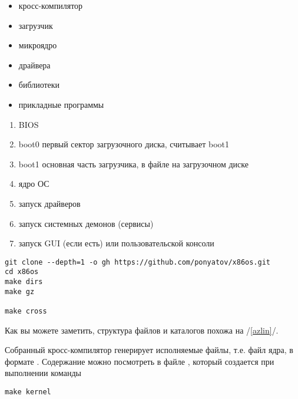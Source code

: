 
\begin{itemize}
  \item кросс-компилятор
  \item загрузчик
  \item микроядро
  \item драйвера
  \item библиотеки
  \item прикладные программы
\end{itemize}


\begin{enumerate}
  \item BIOS
  \item boot0 первый сектор загрузочного диска, считывает boot1
  \item boot1 основная часть загрузчика, в файле на загрузочном диске
  \item ядро ОС
  \item запуск драйверов
  \item запуск системных демонов (сервисы)
  \item запуск GUI (если есть) или пользовательской консоли
\end{enumerate}


\begin{verbatim}
git clone --depth=1 -o gh https://github.com/ponyatov/x86os.git
cd x86os 
make dirs
make gz

make cross
\end{verbatim}


Как вы можете заметить, структура файлов и каталогов похожа на
 /\ref{azlin}/.


Собранный кросс-компилятор генерирует исполняемые файлы, т.е. файл ядра, в
формате . Содержание можно посмотреть в файле
, который создается при выполнении команды 

\begin{verbatim}
make kernel
\end{verbatim}

